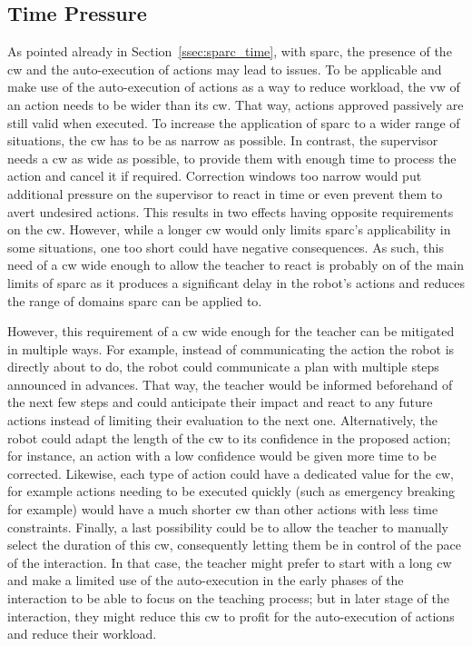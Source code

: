 \subsection{Time Pressure}
As pointed already in Section~\ref{ssec:sparc_time}, with \gls{sparc}, the presence of the \gls{cw} and the auto-execution of actions may lead to issues. To be applicable and make use of the auto-execution of actions as a way to reduce workload, the \gls{vw} of an action needs to be wider than its \gls{cw}. That way, actions approved passively are still valid when executed. To increase the application of \gls{sparc} to a wider range of situations, the \gls{cw} has to be as narrow as possible. In contrast, the supervisor needs a \gls{cw} as wide as possible, to provide them with enough time to process the action and cancel it if required. Correction windows too narrow would put additional pressure on the supervisor to react in time or even prevent them to avert undesired actions. %
This results in two effects having opposite requirements on the \gls{cw}. However, while a longer \gls{cw} would only limits \gls{sparc}'s applicability in some situations, one too short could have negative consequences. As such, this need of a \gls{cw} wide enough to allow the teacher to react is probably on of the main limits of \gls{sparc} as it produces a significant delay in the robot's actions and reduces the range of domains \gls{sparc} can be applied to.

However, this requirement of a \gls{cw} wide enough for the teacher can be mitigated in multiple ways. For example, instead of communicating the action the robot is directly about to do, the robot could communicate a plan with multiple steps announced in advances. That way, the teacher would be informed beforehand of the next few steps and could anticipate their impact and react to any future actions instead of limiting their evaluation to the next one. Alternatively, the robot could adapt the length of the \gls{cw} to its confidence in the proposed action; for instance, an action with a low confidence would be given more time to be corrected. Likewise, each type of action could have a dedicated value for the \gls{cw}, for example actions needing to be executed quickly (such as emergency breaking for example) would have a much shorter \gls{cw} than other actions with less time constraints. Finally, a last possibility could be to allow the teacher to manually select the duration of this \gls{cw}, consequently letting them be in control of the pace of the interaction. In that case, the teacher might prefer to start with a long \gls{cw} and make a limited use of the auto-execution in the early phases of the interaction to be able to focus on the teaching process; but in later stage of the interaction, they might reduce this \gls{cw} to profit for the auto-execution of actions and reduce their workload.


